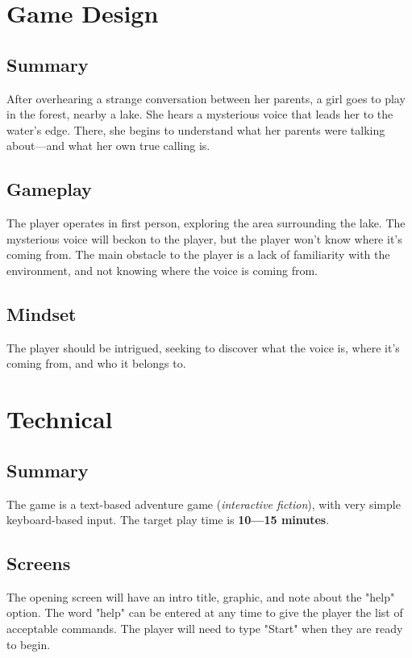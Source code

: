 \documentclass[letterpaper, twoside, 12pt]{memoir}
\begin{document}
\mainmatter
\chapter{Game Design}
\section{Summary}

After overhearing a strange conversation between her parents, a girl goes to play in the forest, nearby a lake. She hears a mysterious voice that leads her to the water’s edge. There, she begins to understand what her parents were talking about---and what her own true calling is.

\section{Gameplay}

The player operates in first person, exploring the area surrounding the lake. The mysterious voice will beckon to the player, but the player won't know where it's coming from. The main obstacle to the player is a lack of familiarity with the environment, and not knowing where the voice is coming from. 

\section{Mindset}

The player should be intrigued, seeking to discover what the voice is, where it's coming from, and who it belongs to.

\chapter{Technical}
\section{Summary}

The game is a text-based adventure game (\textit{interactive fiction}), with very simple keyboard-based input. The target play time is \textbf{10---15 minutes}.

\section{Screens}

The opening screen will have an intro title, graphic, and note about the "help" option. The word "help" can be entered at any time to give the player the list of acceptable commands. The player will need to type "Start" when they are ready to begin. 
\end{document}
